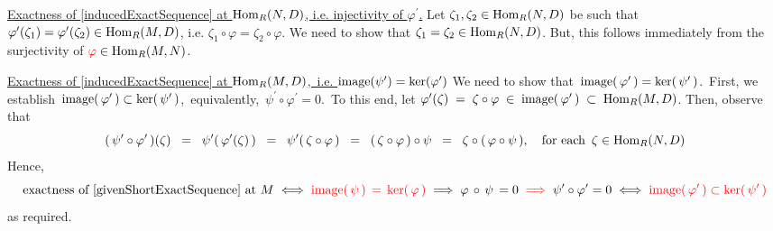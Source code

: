 \vskip 0.25cm
\noindent
\underline{Exactness of \eqref{inducedExactSequence} at $\textnormal{Hom}_{R}(N,D)$, i.e. {\color{red}injectivity of $\varphi^{\prime}$}{\color{white}.}}
\vskip 0.25cm
\noindent
Let $\zeta_{1}, \zeta_{2} \in \textnormal{Hom}_{R}(N,D)$ be such that
$\varphi^{\prime}(\zeta_{1}) = \varphi^{\prime}(\zeta_{2}) \in \textnormal{Hom}_{R}(M,D)$, i.e.
$\zeta_{1} \circ \varphi = \zeta_{2} \circ \varphi$.
We need to show that $\zeta_{1} = \zeta_{2} \in \textnormal{Hom}_{R}(N,D)$.
But, this follows immediately from the {\color{red}surjectivity of} ${\color{red}\varphi} \in \textnormal{Hom}_{R}(M,N)$.


\vskip 0.50cm
\noindent
\underline{Exactness of \eqref{inducedExactSequence} at $\textnormal{Hom}_{R}(M,D)$,\, i.e. $\textnormal{image}(\psi^{\prime}) = \ker(\varphi^{\prime})$}
\vskip 0.25cm
\noindent
We need to show that \,$\textnormal{image}(\,\varphi^{\prime}\,) = \ker(\,\psi^{\prime}\,)$.\,
First, we establish \,$\textnormal{image}(\,\varphi^{\prime}\,) \subset \ker(\,\psi^{\prime}\,)$,\,
equivalently, \,$\psi^{\prime} \circ \varphi^{\prime} = 0$.\,
To this end, let
$\varphi^{\prime}(\zeta) \;=\; \zeta \circ \varphi \;\in\; \textnormal{image}(\,\varphi^{\prime}\,) \;\subset\; \textnormal{Hom}_{R}(M,D)$.
Then, observe that
\begin{equation*}
(\,\psi^{\prime}\circ\varphi^{\prime}\,)(\zeta)
\;\; = \;\;
	\psi^{\prime}(\,\varphi^{\prime}(\zeta)\,)
\;\; = \;\;
	\psi^{\prime}(\,\zeta \circ \varphi\,)
\;\; = \;\;
	(\,\zeta \circ \varphi\,) \circ \psi
\;\; = \;\;
	\zeta \circ (\,\varphi \circ \psi\,),
\quad
	\textnormal{for each \,$\zeta \in \textnormal{Hom}_{R}(N,D)$}
\end{equation*}
Hence,
\begin{equation*}
\textnormal{exactness of \eqref{givenShortExactSequence} at $M$}
\; \Longleftrightarrow \;
	{\color{red}\textnormal{image}(\,\psi\,) \,=\, \ker(\,\varphi\,)}
\; \Longrightarrow \;
	\varphi \,\circ\, \psi \,= 0
\;\; {\color{red}\Longrightarrow} \;\;
	\psi^{\prime} \circ \varphi^{\prime} = 0
\; \Longleftrightarrow \;
	{\color{red}\textnormal{image}(\,\varphi^{\prime}\,) \subset \ker(\,\psi^{\prime}\,)}
\end{equation*}
as required.

